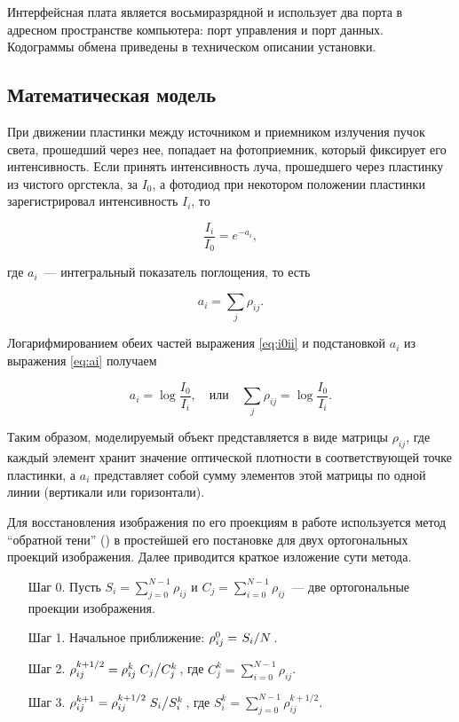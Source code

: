 Интерфейсная плата является восьмиразрядной и использует два порта в адресном пространстве компьютера: порт управления и порт данных. Кодограммы обмена приведены в техническом описании установки.

\subsection{Математическая модель}

При движении пластинки между источником и приемником излучения пучок света, прошедший через нее, попадает на фотоприемник, который фиксирует его интенсивность. Если принять интенсивность луча, прошедшего через пластинку из чистого оргстекла, за $I_0$, а фотодиод при некотором положении пластинки зарегистрировал интенсивность $I_i$, то

\begin{equation}\label{eq:i0ii}
    \frac{I_i}{I_0} = e^{-a_i} ,
\end{equation}

где $a_i$~--- интегральный показатель поглощения, то есть

\begin{equation}\label{eq:ai}
    a_i = \sum\limits_j\rho_{ij} .
\end{equation}

Логарифмированием обеих частей выражения \autoref{eq:i0ii} и подстановкой $a_i$ из выражения \autoref{eq:ai} получаем

\begin{equation}
    a_i = \log\frac{I_0}{I_i} ,
        \quad \text{или} \quad
    \sum\limits_j\rho_{ij} = \log\frac{I_0}{I_i} .
\end{equation}

Таким образом, моделируемый объект представляется в виде матрицы $\rho_{ij}$, где каждый элемент хранит значение оптической плотности в соответствующей точке пластинки, а $a_i$ представляет собой сумму элементов этой матрицы по одной линии (вертикали или горизонтали).

Для восстановления изображения по его проекциям в работе используется метод \enquote{обратной тени} () в простейшей его постановке для двух ортогональных проекций изображения. Далее приводится краткое изложение сути метода.

\begin{enumerate}
\item [Шаг 0.] Пусть $S_i = \sum\limits_{j=0}^{N-1}\rho_{ij}$ и $C_j = \sum\limits_{i=0}^{N-1}\rho_{ij}$~--- две ортогональные проекции изображения.
\item [Шаг 1.] Начальное приближение: $\rho^0_{ij} = \flatfrac{S_i}{N}$.
\item [Шаг 2.] $\rho^{k+1/2}_{ij} = \rho^k_{ij} \flatfrac{C_j}{C^k_j}$, где $C^k_j = \sum\limits_{i=0}^{N-1}\rho_{ij}$.
\item [Шаг 3.] $\rho^{k+1}_{ij} = \rho^{k+1/2}_{ij} \flatfrac{S_i}{S^k_i}$, где $S^k_i = \sum\limits_{j=0}^{N-1}\rho^{k+1/2}_{ij}$.
\end{enumerate}


